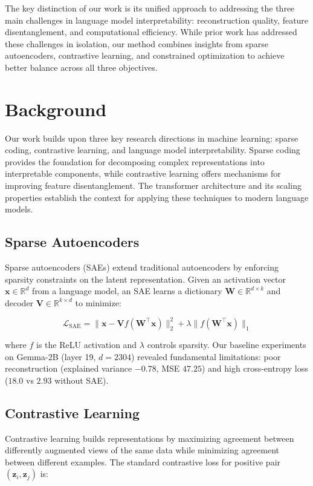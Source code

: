 \documentclass{article} %
\begin{document}
The key distinction of our work is its unified approach to addressing the three main challenges in language model interpretability: reconstruction quality, feature disentanglement, and computational efficiency. While prior work has addressed these challenges in isolation, our method combines insights from sparse autoencoders, contrastive learning, and constrained optimization to achieve better balance across all three objectives.

\section{Background}
\label{sec:background}

Our work builds upon three key research directions in machine learning: sparse coding, contrastive learning, and language model interpretability. Sparse coding \cite{goodfellow2016deep} provides the foundation for decomposing complex representations into interpretable components, while contrastive learning offers mechanisms for improving feature disentanglement. The transformer architecture \cite{vaswani2017attention} and its scaling properties \cite{radford2019language} establish the context for applying these techniques to modern language models.

\subsection{Sparse Autoencoders}
Sparse autoencoders (SAEs) extend traditional autoencoders by enforcing sparsity constraints on the latent representation. Given an activation vector $\mathbf{x} \in \mathbb{R}^{d}$ from a language model, an SAE learns a dictionary $\mathbf{W} \in \mathbb{R}^{d \times k}$ and decoder $\mathbf{V} \in \mathbb{R}^{k \times d}$ to minimize:

\begin{equation}
    \mathcal{L}_{\text{SAE}} = \|\mathbf{x} - \mathbf{V}f(\mathbf{W}^\top\mathbf{x})\|_2^2 + \lambda \|f(\mathbf{W}^\top\mathbf{x})\|_1
\end{equation}

where $f$ is the ReLU activation and $\lambda$ controls sparsity. Our baseline experiments on Gemma-2B (layer 19, $d=2304$) revealed fundamental limitations: poor reconstruction (explained variance $-0.78$, MSE $47.25$) and high cross-entropy loss ($18.0$ vs $2.93$ without SAE).

\subsection{Contrastive Learning}
Contrastive learning builds representations by maximizing agreement between differently augmented views of the same data while minimizing agreement between different examples. The standard contrastive loss for positive pair $(\mathbf{z}_i, \mathbf{z}_j)$ is:
\end{document}

